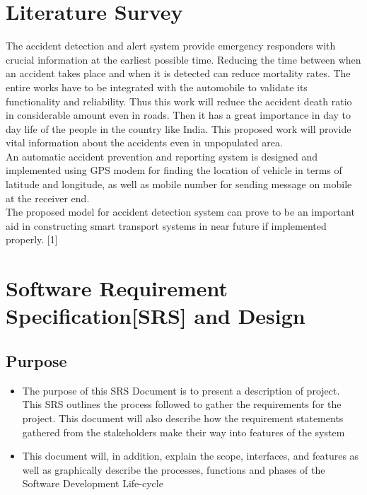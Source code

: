 \documentclass{article}
\begin{document}
\begin{flushleft}
\begin{itemize}
            
            
            \end{itemize}
            
        
        \newpage
    
    \section{Literature Survey}
   The  accident  detection  and  alert  system  provide emergency responders  with crucial  information  at  the earliest possible time. Reducing the time between when an accident  takes place  and when  it is  detected  can reduce mortality  rates.  The  entire  works  have  to  be  integrated with  the  automobile  to  validate  its  functionality  and reliability. Thus this  work will reduce the accident death ratio in considerable  amount even in  roads. Then it has a great importance in day to day life of the people in the  country like  India. This  proposed  work  will  provide vital information about the accidents even in unpopulated area.\\ An automatic accident prevention and reporting system is designed  and  implemented  using GPS modem for finding the location of vehicle in terms of latitude and longitude, as  well  as mobile number for  sending  message  on  mobile  at the receiver end.\\  The  proposed  model  for  accident  detection system  can prove  to  be  an  important  aid  in  constructing  smart transport systems in near future  if implemented properly.  [1]
    \newpage
    
    \section{Software Requirement Specification[SRS] and Design}
        \subsection{Purpose}
        \begin{itemize}
            \item The purpose of this SRS Document is to present a description of project. This SRS outlines the process followed to gather the requirements for the project. This document will also describe how the requirement statements gathered from the stakeholders make their way into features of the system
            \item This document will, in addition, explain the scope, interfaces, and features as well as graphically describe the processes, functions and phases of the Software Development Life-cycle
        \end{itemize}

\end{flushleft}
\end{document}
